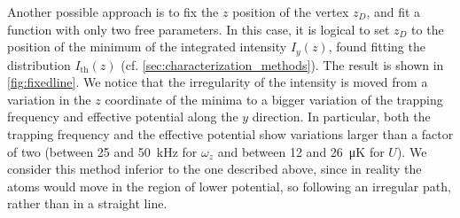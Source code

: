 Another possible approach is to fix the $z$ position of the vertex $z_D$, and fit a function with only two free parameters. In this case, it is logical to set $z_D$ to the position of the minimum of the integrated intensity $I_y(z)$, found fitting the distribution $I_\text{th}(z)$ (cf. \cref{sec:characterization_methods}). The result is shown in \cref{fig:fixedline}. We notice that the irregularity of the intensity is moved from a variation in the $z$ coordinate of the minima to a bigger variation of the trapping frequency and effective potential along the $y$ direction. In particular, both the trapping frequency and the effective potential show variations larger than a factor of two (between 25 and \SI{50}{kHz} for $\omega_z$ and between 12 and \SI{26}{\micro K} for $U$). We consider this method inferior to the one described above, since in reality the atoms would move in the region of lower potential, so following an irregular path, rather than in a straight line.

